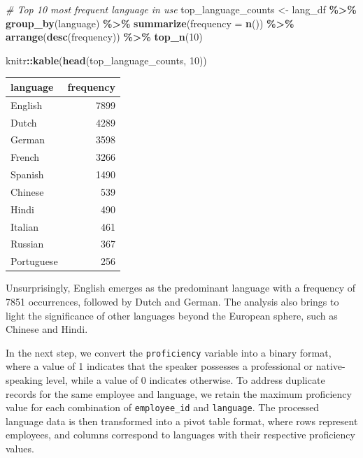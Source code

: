\documentclass[11pt,]{article}
\newenvironment{Shaded}{\begin{snugshade}}{\end{snugshade}}
\newcommand{\AttributeTok}[1]{\textcolor[rgb]{0.13,0.29,0.53}{#1}}
\newcommand{\CommentTok}[1]{\textcolor[rgb]{0.56,0.35,0.01}{\textit{#1}}}
\newcommand{\DecValTok}[1]{\textcolor[rgb]{0.00,0.00,0.81}{#1}}
\newcommand{\FunctionTok}[1]{\textcolor[rgb]{0.13,0.29,0.53}{\textbf{#1}}}
\newcommand{\NormalTok}[1]{#1}
\newcommand{\OtherTok}[1]{\textcolor[rgb]{0.56,0.35,0.01}{#1}}
\newcommand{\SpecialCharTok}[1]{\textcolor[rgb]{0.81,0.36,0.00}{\textbf{#1}}}
\begin{document}
\begin{Shaded}
\begin{Highlighting}[]
\CommentTok{\# Top 10 most frequent language in use}
\NormalTok{top\_language\_counts }\OtherTok{\textless{}{-}}\NormalTok{ lang\_df }\SpecialCharTok{\%\textgreater{}\%}
  \FunctionTok{group\_by}\NormalTok{(language) }\SpecialCharTok{\%\textgreater{}\%}
  \FunctionTok{summarize}\NormalTok{(}\AttributeTok{frequency =} \FunctionTok{n}\NormalTok{()) }\SpecialCharTok{\%\textgreater{}\%} 
  \FunctionTok{arrange}\NormalTok{(}\FunctionTok{desc}\NormalTok{(frequency)) }\SpecialCharTok{\%\textgreater{}\%} 
  \FunctionTok{top\_n}\NormalTok{(}\DecValTok{10}\NormalTok{)}

\NormalTok{knitr}\SpecialCharTok{::}\FunctionTok{kable}\NormalTok{(}\FunctionTok{head}\NormalTok{(top\_language\_counts, }\DecValTok{10}\NormalTok{))}
\end{Highlighting}
\end{Shaded}

\begin{tabular}{l|r}
\hline
language & frequency\\
\hline
English & 7899\\
\hline
Dutch & 4289\\
\hline
German & 3598\\
\hline
French & 3266\\
\hline
Spanish & 1490\\
\hline
Chinese & 539\\
\hline
Hindi & 490\\
\hline
Italian & 461\\
\hline
Russian & 367\\
\hline
Portuguese & 256\\
\hline
\end{tabular}

\hfill\break
Unsurprisingly, English emerges as the predominant language with a
frequency of 7851 occurrences, followed by Dutch and German. The
analysis also brings to light the significance of other languages beyond
the European sphere, such as Chinese and Hindi.

In the next step, we convert the \texttt{proficiency} variable into a
binary format, where a value of 1 indicates that the speaker possesses a
professional or native-speaking level, while a value of 0 indicates
otherwise. To address duplicate records for the same employee and
language, we retain the maximum proficiency value for each combination
of \texttt{employee\_id} and \texttt{language}. The processed language
data is then transformed into a pivot table format, where rows represent
employees, and columns correspond to languages with their respective
proficiency values.
\end{document}
